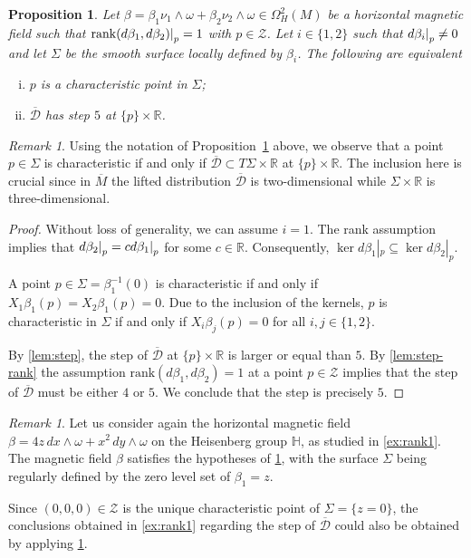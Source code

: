 \documentclass{amsart}
\theoremstyle{plain}
\newtheorem{proposition}[theorem]{Proposition}
\theoremstyle{definition}
\theoremstyle{remark}
\newtheorem{remark}[thm]{Remark}
\newcommand{\R}{\mathbb{R}}
\newcommand{\diff}{d}%
\newcommand{\distr}{\mathcal{D}}								%
\newcommand{\B}{\beta}
\newcommand{\lift}[1]{\overline{#1}} 							%
\newcommand{\mg}{\B_1\nu_1\wedge \omega
										+\B_2\nu_2\wedge \omega}	%
\newcommand\restr[2]{{													%
  \left.\kern-\nulldelimiterspace 					
  #1 																			
  \right|_{#2} 														
  }}
\begin{document}
\begin{proposition}\label{prop:rank1}
Let $\B=\mg\in\Omega^2_H(M)$ be a horizontal magnetic field such that $\mathrm{rank}\restr{\left(\diff\B_1,\diff\B_2\right)}{p}=1$ with $p\in \mathcal{Z}$.
Let $i\in \{1,2\}$ such that $\restr{\diff \B_i}{p}\neq 0$
and let $\Sigma$ be the smooth surface locally defined by $\B_i$.
The following are equivalent
\begin{enumerate}[(i)]
	\item \label{item:surface2} $p$ is a characteristic point in $\Sigma$;
	\item \label{item:surface3} $\lift\distr$ has step $5$ at $\{p\}\times \R$.
\end{enumerate}

\end{proposition}
\begin{remark}
Using the notation of Proposition~\ref{prop:rank1} above, we observe that a point $p\in \Sigma$ is characteristic if and only if $\lift\distr \subset T\Sigma\times \R$ at $\{p\}\times \R$. The inclusion here is crucial since in $\lift M$ the lifted distribution $\lift \distr$ is two-dimensional while $\Sigma\times \R$ is three-dimensional.

\end{remark}


\begin{proof}
Without loss of generality, we can assume $i=1$. The rank assumption implies that $\restr{\diff \B_2}{p} = c \restr{\diff \B_1}{p}$ for some $c\in \R$. Consequently,  $\ker \diff \B_1|_{p} \subseteq \ker \diff \B_2|_{p}$.

A point $p \in \Sigma=\beta_{1}^{-1}(0)$ is characteristic if and only if $X_1 \B_1(p) = X_2 \B_1(p) = 0$. Due to the inclusion of the kernels, $p$ is characteristic in $\Sigma$ if and only if $X_i \B_j(p) = 0$ for all  $i, j \in \{1,2\}$.

By \cref{lem:step}, the step of $\lift \distr$ at  $\{p\} \times \R$ is larger or equal than $5$.  
By \cref{lem:step-rank} the assumption $\mathrm{rank}\left(\diff \B_1, \diff \B_2\right) = 1$ at a point $p \in \mathcal{Z}$ implies that the step of $\lift \distr$ must be either $4$ or $5$. We conclude that the step is precisely $5$.
\end{proof}


\begin{remark}
Let us consider again the horizontal magnetic field \( \B = 4z \, dx \wedge \omega + x^2 \, dy \wedge \omega \) on the Heisenberg group $\mathbb{H}$, as studied in \cref{ex:rank1}. The magnetic field \( \B \) satisfies the hypotheses of \cref{prop:rank1}, with the surface \( \Sigma \) being regularly defined by the zero level set of \( \B_1 = z \).

Since \( (0,0,0) \in \mathcal{Z} \) is the unique characteristic point of \( \Sigma=\{z=0\} \), the conclusions obtained in \cref{ex:rank1} regarding the step of \( \lift \distr \) could also be obtained by applying \cref{prop:rank1}.
\end{remark}
\end{document}
